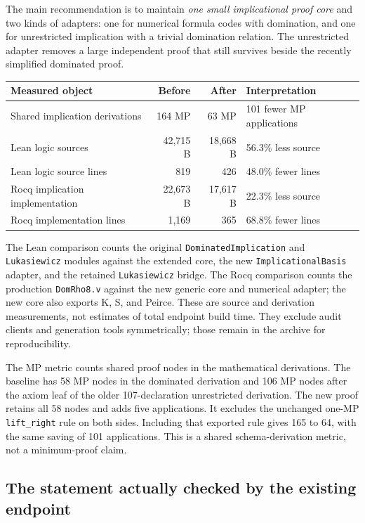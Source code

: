 \documentclass[11pt,letterpaper]{article}
\newcommand{\core}{\texttt{DominatedImplication}}
\begin{document}
The main recommendation is to maintain \emph{one small implicational proof core}
and two kinds of adapters: one for numerical formula codes with domination, and
one for unrestricted implication with a trivial domination relation. The
unrestricted adapter removes a large independent proof that still survives
beside the recently simplified dominated proof.

\begin{center}
\begin{tabular}{p{}rrp{}}
\toprule
Measured object & Before & After & Interpretation\\
\midrule
Shared implication derivations & 164 MP & 63 MP & 101 fewer MP applications\\
Lean logic sources & 42,715 B & 18,668 B & 56.3\% less source\\
Lean logic source lines & 819 & 426 & 48.0\% fewer lines\\
Rocq implication implementation & 22,673 B & 17,617 B & 22.3\% less source\\
Rocq implementation lines & 1,169 & 365 & 68.8\% fewer lines\\
\bottomrule
\end{tabular}
\end{center}

The Lean comparison counts the original \core{} and \texttt{Lukasiewicz} modules
against the extended core, the new \texttt{ImplicationalBasis} adapter, and the
retained \texttt{Lukasiewicz} bridge. The Rocq comparison counts the production
\texttt{DomRho8.v} against the new generic core and numerical adapter; the new
core also exports K, S, and Peirce. These are source and derivation measurements,
not estimates of total endpoint build time. They exclude audit clients and
generation tools symmetrically; those remain in the archive for reproducibility.

The MP metric counts shared proof nodes in the mathematical derivations. The
baseline has 58 MP nodes in the dominated derivation and 106 MP nodes after the
axiom leaf of the older 107-declaration unrestricted derivation. The new proof
retains all 58 nodes and adds five applications. It excludes the unchanged
one-MP \texttt{lift\_right} rule on both sides. Including that exported rule
gives 165 to 64, with the same saving of 101 applications. This is a shared
schema-derivation metric, not a minimum-proof claim.

\subsection{The statement actually checked by the existing endpoint}
\end{document}
